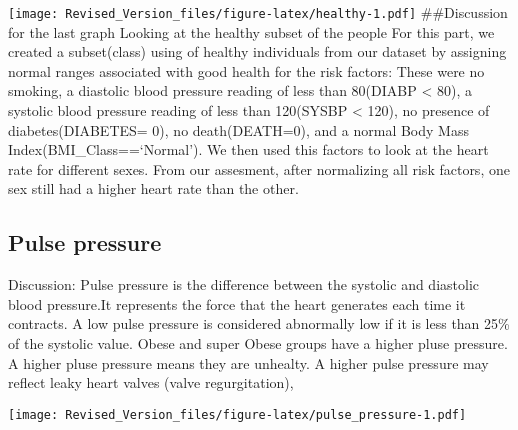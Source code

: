 \documentclass[]{article}
\newenvironment{Shaded}{\begin{snugshade}}{\end{snugshade}}
\newcommand{\KeywordTok}[1]{\textcolor[rgb]{0.13,0.29,0.53}{\textbf{#1}}}
\newcommand{\DataTypeTok}[1]{\textcolor[rgb]{0.13,0.29,0.53}{#1}}
\newcommand{\DecValTok}[1]{\textcolor[rgb]{0.00,0.00,0.81}{#1}}
\newcommand{\FloatTok}[1]{\textcolor[rgb]{0.00,0.00,0.81}{#1}}
\newcommand{\StringTok}[1]{\textcolor[rgb]{0.31,0.60,0.02}{#1}}
\newcommand{\OperatorTok}[1]{\textcolor[rgb]{0.81,0.36,0.00}{\textbf{#1}}}
\newcommand{\NormalTok}[1]{#1}
\begin{document}
\texttt{[image: Revised\_Version\_files/figure-latex/healthy-1.pdf]}
\#\#Discussion for the last graph Looking at the healthy subset of the
people For this part, we created a subset(class) using of healthy
individuals from our dataset by assigning normal ranges associated with
good health for the risk factors: These were no smoking, a diastolic
blood pressure reading of less than 80(DIABP \textless{} 80), a systolic
blood pressure reading of less than 120(SYSBP \textless{} 120), no
presence of diabetes(DIABETES= 0), no death(DEATH=0), and a normal Body
Mass Index(BMI\_Class==`Normal'). We then used this factors to look at
the heart rate for different sexes. From our assesment, after
normalizing all risk factors, one sex still had a higher heart rate than
the other.

\subsection{Pulse pressure}\label{pulse-pressure}

Discussion: Pulse pressure is the difference between the systolic and
diastolic blood pressure.It represents the force that the heart
generates each time it contracts. A low pulse pressure is considered
abnormally low if it is less than 25\% of the systolic value. Obese and
super Obese groups have a higher pluse pressure. A higher pluse pressure
means they are unhealty. A higher pulse pressure may reflect leaky heart
valves (valve regurgitation),

\begin{Shaded}
\end{Shaded}

\texttt{[image: Revised\_Version\_files/figure-latex/pulse\_pressure-1.pdf]}
\end{document}
